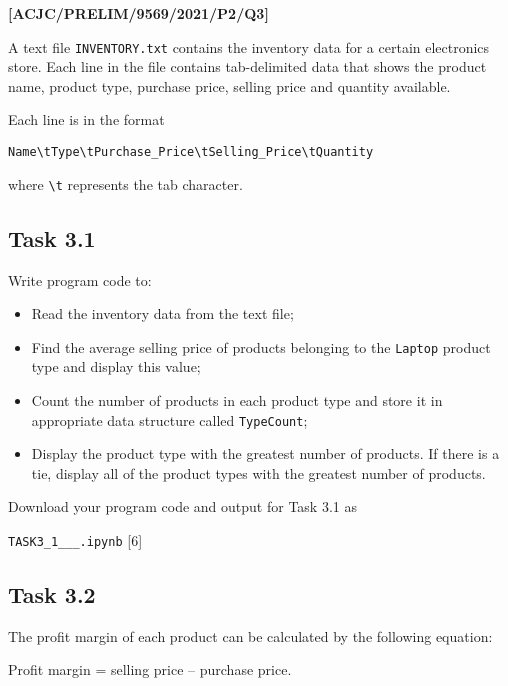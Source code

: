 \item \textbf{{[}ACJC/PRELIM/9569/2021/P2/Q3{]} }

A text file \texttt{INVENTORY.txt} contains the inventory data for
a certain electronics store. Each line in the file contains tab-delimited
data that shows the product name, product type, purchase price, selling
price and quantity available.

Each line is in the format

\texttt{Name\textbackslash tType\textbackslash tPurchase\_Price\textbackslash tSelling\_Price\textbackslash tQuantity}

where \texttt{\textbackslash t} represents the tab character.

\subsection*{Task 3.1 }

Write program code to:
\begin{itemize}
\item Read the inventory data from the text file; 
\item Find the average selling price of products belonging to the \texttt{Laptop}
product type and display this value; 
\item Count the number of products in each product type and store it in
appropriate data structure called \texttt{TypeCount}; 
\item Display the product type with the greatest number of products. If
there is a tie, display all of the product types with the greatest
number of products.
\end{itemize}
Download your program code and output for Task 3.1 as 

\texttt{TASK3\_1\_<your name>\_<centre number>\_<index number>.ipynb}
\hfill{}{[}6{]}

\subsection*{Task 3.2 }

The profit margin of each product can be calculated by the following
equation:
\noindent \begin{center}
Profit margin = selling price -- purchase price.
\par\end{center}

